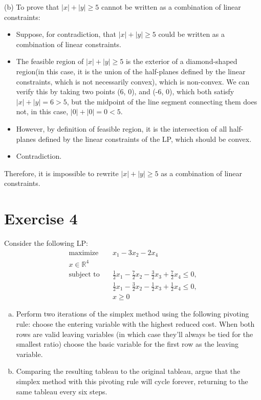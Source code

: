 \documentclass{article}
\begin{document}
(b) To prove that $|x| + |y| \geq 5$ cannot be written as a combination of linear constraints:

\begin{itemize}
\item Suppose, for contradiction, that $|x| + |y| \geq 5$ could be written as a combination of linear constraints.
\item The feasible region of $|x| + |y| \geq 5$ is the exterior of a diamond-shaped region(in this case, it is the union of the half-planes defined by the linear constraints, which is not necessarily convex), which is non-convex. We can verify this by taking two points (6, 0), and (-6, 0), which both satisfy $|x| + |y| = 6 > 5$, but the midpoint of the line segment connecting them does not, in this case, $|0| + |0| = 0 < 5$.
\item However, by definition of feasible region, it is the intersection of all half-planes defined by the linear constraints of the LP, which should be convex.
\item Contradiction.
\end{itemize}
Therefore, it is impossible to rewrite $|x| + |y| \geq 5$ as a combination of linear constraints.

\newpage

\section*{Exercise 4}
Consider the following LP:
\begin{align*}
\text{maximize} \quad & x_1 - 3x_2 - 2x_4 \\
x \in \mathbb{R}^4 \\
\text{subject to} \quad & \frac{1}{2}x_1 - \frac{7}{2}x_2 - \frac{3}{2}x_3 + \frac{7}{2}x_4 \leq 0, \\
& \frac{1}{2}x_1 - \frac{3}{2}x_2 - \frac{1}{2}x_3 + \frac{1}{2}x_4 \leq 0, \\
& x \geq 0
\end{align*}

\begin{enumerate}[(a)]
\item Perform two iterations of the simplex method using the following pivoting rule: choose the entering variable with the highest reduced cost. When both rows are valid leaving variables (in which case they'll always be tied for the smallest ratio) choose the basic variable for the first row as the leaving variable.
\item Comparing the resulting tableau to the original tableau, argue that the simplex method with this pivoting rule will cycle forever, returning to the same tableau every six steps.
\end{enumerate}
\end{document}
